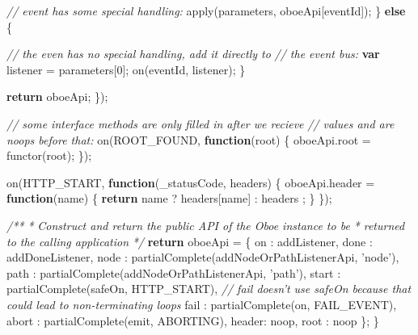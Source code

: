 \documentclass[12pt, ]{article}
\newenvironment{Shaded}{}{}
\newcommand{\KeywordTok}[1]{\textcolor[rgb]{0.00,0.44,0.13}{\textbf{{#1}}}}
\newcommand{\DataTypeTok}[1]{\textcolor[rgb]{0.56,0.13,0.00}{{#1}}}
\newcommand{\DecValTok}[1]{\textcolor[rgb]{0.25,0.63,0.44}{{#1}}}
\newcommand{\StringTok}[1]{\textcolor[rgb]{0.25,0.44,0.63}{{#1}}}
\newcommand{\CommentTok}[1]{\textcolor[rgb]{0.38,0.63,0.69}{\textit{{#1}}}}
\newcommand{\OtherTok}[1]{\textcolor[rgb]{0.00,0.44,0.13}{{#1}}}
\newcommand{\FunctionTok}[1]{\textcolor[rgb]{0.02,0.16,0.49}{{#1}}}
\newcommand{\NormalTok}[1]{{#1}}
\begin{document}
\begin{Shaded}
\begin{Highlighting}[]
         \CommentTok{// event has some special handling:}
         \FunctionTok{apply}\NormalTok{(parameters, oboeApi[eventId]);}
      \NormalTok{\} }\KeywordTok{else} \NormalTok{\{}
      
         \CommentTok{// the even has no special handling, add it directly to}
         \CommentTok{// the event bus:         }
         \KeywordTok{var} \NormalTok{listener = parameters[}\DecValTok{0}\NormalTok{]; }
         \FunctionTok{on}\NormalTok{(eventId, listener);}
      \NormalTok{\}}
      
      \KeywordTok{return} \NormalTok{oboeApi;}
   \NormalTok{\});   }
   
   \CommentTok{// some interface methods are only filled in after we recieve}
   \CommentTok{// values and are noops before that:          }
   \FunctionTok{on}\NormalTok{(ROOT_FOUND, }\KeywordTok{function}\NormalTok{(root) \{}
      \OtherTok{oboeApi}\NormalTok{.}\FunctionTok{root} \NormalTok{= }\FunctionTok{functor}\NormalTok{(root);   }
   \NormalTok{\});}
   
   \FunctionTok{on}\NormalTok{(HTTP_START, }\KeywordTok{function}\NormalTok{(_statusCode, headers) \{}
      \OtherTok{oboeApi}\NormalTok{.}\FunctionTok{header} \NormalTok{= }
         \KeywordTok{function}\NormalTok{(name) \{}
            \KeywordTok{return} \NormalTok{name ? headers[name] }
                        \NormalTok{: headers}
                        \NormalTok{;}
         \NormalTok{\}}
   \NormalTok{\});}
      
   \CommentTok{/**}
\CommentTok{    * Construct and return the public API of the Oboe instance to be }
\CommentTok{    * returned to the calling application}
\CommentTok{    */}       
   \KeywordTok{return} \NormalTok{oboeApi = \{}
      \DataTypeTok{on    }\NormalTok{:  addListener,   }
      \DataTypeTok{done  }\NormalTok{:  addDoneListener,       }
      \DataTypeTok{node  }\NormalTok{:  }\FunctionTok{partialComplete}\NormalTok{(addNodeOrPathListenerApi, }\StringTok{'node'}\NormalTok{),}
      \DataTypeTok{path  }\NormalTok{:  }\FunctionTok{partialComplete}\NormalTok{(addNodeOrPathListenerApi, }\StringTok{'path'}\NormalTok{),      }
      \DataTypeTok{start }\NormalTok{:  }\FunctionTok{partialComplete}\NormalTok{(safeOn, HTTP_START),}
      \CommentTok{// fail doesn't use safeOn because that could lead to non-terminating loops}
      \DataTypeTok{fail  }\NormalTok{:  }\FunctionTok{partialComplete}\NormalTok{(on, FAIL_EVENT),}
      \DataTypeTok{abort }\NormalTok{:  }\FunctionTok{partialComplete}\NormalTok{(emit, ABORTING),}
      \DataTypeTok{header}\NormalTok{:  noop,}
      \DataTypeTok{root  }\NormalTok{:  noop}
   \NormalTok{\};   }
\NormalTok{\}   }
   
\end{Highlighting}
\end{Shaded}
\end{document}
